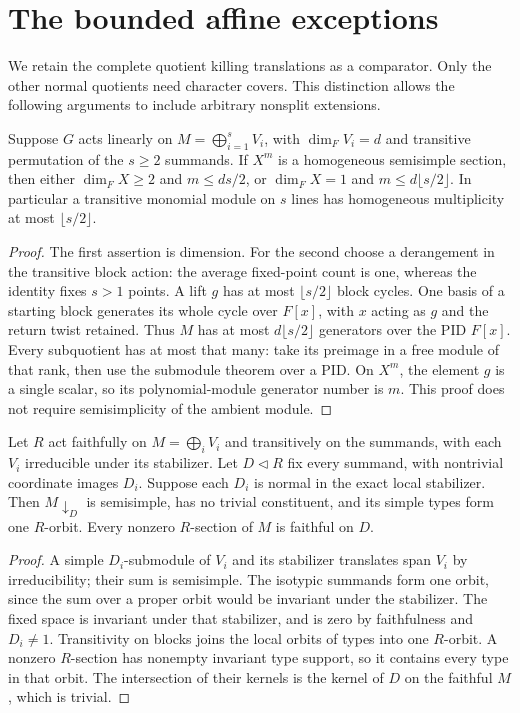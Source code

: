 \section{The bounded affine exceptions}
\label{sec:finite-affine-frames}
We retain the complete quotient killing translations as a comparator.
Only the other normal quotients need character covers. This distinction
allows the following arguments to include arbitrary nonsplit extensions.

\begin{lemma}
\label{lem:block-homogeneous}
Suppose $G$ acts linearly on $M=\bigoplus_{i=1}^sV_i$, with
$\dim_FV_i=d$ and transitive permutation of the $s\geq2$ summands.
If $X^m$ is a homogeneous semisimple section, then either
$\dim_FX\geq2$ and $m\leq ds/2$, or $\dim_FX=1$ and
$m\leq d\lfloor s/2\rfloor$. In particular a transitive
monomial module on $s$ lines has homogeneous multiplicity at most
$\lfloor s/2\rfloor$.
\end{lemma}
\begin{proof}
The first assertion is dimension. For the second choose a derangement
in the transitive block action: the average fixed-point count is one,
whereas the identity fixes $s>1$ points. A lift $g$ has at most
$\lfloor s/2\rfloor$ block cycles. One basis of a starting block
generates its whole cycle over $F[x]$, with $x$ acting as $g$ and
the return twist retained. Thus $M$ has at most $d\lfloor s/2\rfloor$
generators over the PID $F[x]$. Every subquotient has at most that
many: take its preimage in a free module of that rank, then use
the submodule theorem over a PID. On $X^m$, the element $g$ is a
single scalar, so its polynomial-module generator number is $m$.
This proof does not require semisimplicity of the ambient module.
\end{proof}

\begin{lemma}
\label{lem:faithful-core-section}
Let $R$ act faithfully on $M=\bigoplus_iV_i$ and transitively on
the summands, with each $V_i$ irreducible under its stabilizer.
Let $D\lhd R$ fix every summand, with nontrivial coordinate images
$D_i$. Suppose each $D_i$ is normal in the exact local stabilizer.
Then $M\downarrow_D$ is semisimple, has no trivial constituent,
and its simple types form one $R$-orbit. Every nonzero $R$-section
of $M$ is faithful on $D$.
\end{lemma}
\begin{proof}
A simple $D_i$-submodule of $V_i$ and its stabilizer translates
span $V_i$ by irreducibility; their sum is semisimple. The isotypic
summands form one orbit, since the sum over a proper orbit would
be invariant under the stabilizer. The fixed space is invariant
under that stabilizer, and is zero by faithfulness and $D_i\ne1$.
Transitivity on blocks joins the local orbits of types into one
$R$-orbit. A nonzero $R$-section has nonempty invariant type support,
so it contains every type in that orbit. The intersection of their
kernels is the kernel of $D$ on the faithful $M$, which is trivial.
\end{proof}

